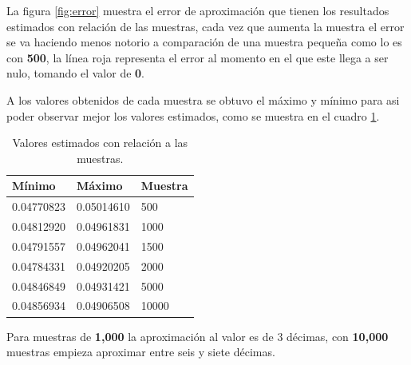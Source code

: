 \documentclass{article}
\begin{document}
La figura \ref{fig:error} muestra el error de aproximaci\'on que tienen los resultados estimados con relaci\'on de las muestras, cada vez que aumenta la muestra el error se va haciendo menos notorio a comparaci\'on de una muestra peque\~na como lo es con \textbf{500}, la l\'inea roja representa el error al momento en el que este llega a ser nulo, tomando el valor de \textbf{0}.

A los valores obtenidos de cada muestra se obtuvo el m\'aximo y m\'inimo para asi poder observar mejor los valores estimados, como se muestra en el cuadro \ref{tabla:valores}.

\begin{table}[htb]
\centering
\begin{tabular}{|l|l|l|}
M\'inimo & M\'aximo & Muestra \\
\hline
0.04770823 & 0.05014610 & 500 \\ \hline
0.04812920 & 0.04961831 & 1000 \\ \hline
0.04791557 & 0.04962041 & 1500 \\ \hline
0.04784331 & 0.04920205 & 2000 \\ \hline
0.04846849 & 0.04931421 & 5000 \\ \hline
0.04856934 & 0.04906508 & 10000 \\ \hline
\end{tabular}
\caption{Valores estimados con relaci\'on a las muestras.}
\label{tabla:valores}
\end{table}

Para muestras de \textbf{1,000} la aproximaci\'on al valor es de 3 d\'ecimas, con \textbf{10,000} muestras empieza aproximar entre seis y siete d\'ecimas.

\newpage



\end{document}
